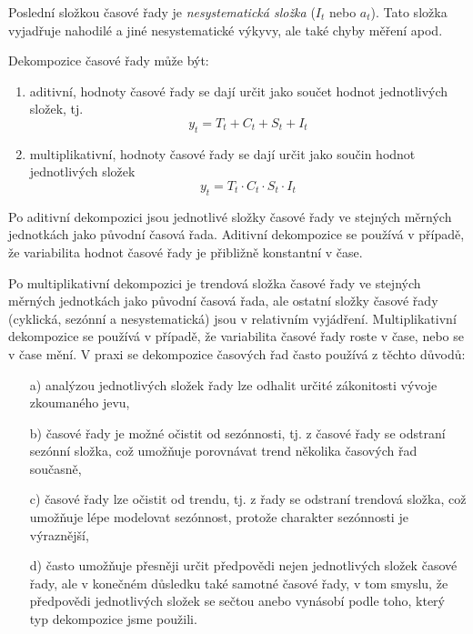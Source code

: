 \documentclass[a4paper,12pt,twoside]{scrreprt}
\begin{document}
Poslední složkou časové řady je \textit{nesystematická složka} ($I_t$ nebo $a_t$). Tato složka vyjadřuje nahodilé a jiné nesystematické výkyvy, ale také chyby měření apod. 

Dekompozice časové řady může být:

\begin{enumerate}

\item aditivní, hodnoty časové řady se dají určit jako součet hodnot jednotlivých složek, tj.
\begin{equation}
y_t = T_t + C_t + S_t + I_t
\end{equation}

\item multiplikativní, hodnoty časové řady se dají určit jako součin hodnot jednotlivých složek
\begin{equation}
y_t = T_t \cdot C_t \cdot S_t \cdot I_t
\end{equation}

\end{enumerate}

Po aditivní dekompozici jsou jednotlivé složky časové řady ve stejných měrných
jednotkách jako původní časová řada. Aditivní dekompozice se používá v případě, že
variabilita hodnot časové řady je přibližně konstantní v čase.

Po multiplikativní dekompozici je trendová složka časové řady ve stejných
měrných jednotkách jako původní časová řada, ale ostatní složky časové řady (cyklická,
sezónní a nesystematická) jsou v relativním vyjádření. Multiplikativní dekompozice se
používá v případě, že variabilita časové řady roste v čase, nebo se v čase mění. V praxi se dekompozice časových řad často používá z těchto důvodů:

\begin{itemize}
\item[a)] analýzou jednotlivých složek řady lze odhalit určité zákonitosti vývoje zkoumaného jevu,
\item[b)] časové řady je možné očistit od sezónnosti, tj. z časové řady se odstraní sezónní složka, což umožňuje porovnávat trend několika časových řad současně,
\item[c)] časové řady lze očistit od trendu, tj. z řady se odstraní trendová složka, což umožňuje lépe modelovat sezónnost, protože charakter sezónnosti je výraznější,
\item[d)] často umožňuje přesněji určit předpovědi nejen jednotlivých složek časové řady, ale v konečném důsledku také samotné časové řady, v tom smyslu, že předpovědi
jednotlivých složek se sečtou anebo vynásobí podle toho, který typ dekompozice jsme
použili.
\end{itemize}
\end{document}
